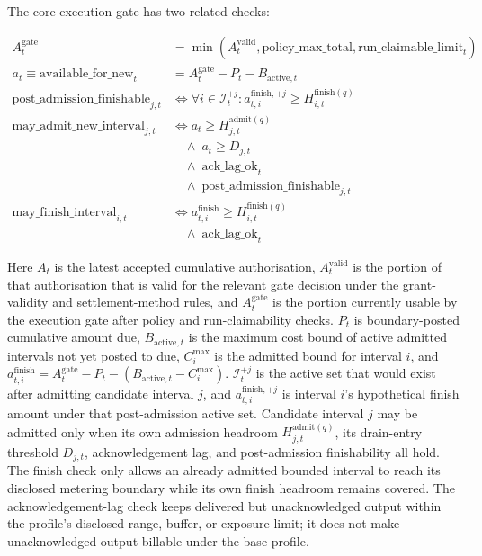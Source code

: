\documentclass[11pt]{article}
\begin{document}
The core execution gate has two related checks:

\[
\begin{aligned}
A_t^{\mathrm{gate}} &=
\min(A_t^{\mathrm{valid}},\mathrm{policy\_max\_total},\mathrm{run\_claimable\_limit}_t)\\
a_t \equiv \mathrm{available\_for\_new}_t &=
A_t^{\mathrm{gate}} - P_t - B_{\mathrm{active},t}\\
\mathrm{post\_admission\_finishable}_{j,t} &\iff
\forall i \in \mathcal{I}_t^{+j}:
a_{t,i}^{\mathrm{finish},+j} \geq H_{i,t}^{\mathrm{finish}(q)}\\
\mathrm{may\_admit\_new\_interval}_{j,t} &\iff
a_t \geq H_{j,t}^{\mathrm{admit}(q)}\\
&\quad\land\;
a_t \geq D_{j,t}\\
&\quad\land\;
\mathrm{ack\_lag\_ok}_t\\
&\quad\land\;
\mathrm{post\_admission\_finishable}_{j,t}\\
\mathrm{may\_finish\_interval}_{i,t} &\iff
a_{t,i}^{\mathrm{finish}} \geq H_{i,t}^{\mathrm{finish}(q)}\\
&\quad\land\;
\mathrm{ack\_lag\_ok}_t
\end{aligned}
\]

Here \(A_t\) is the latest accepted cumulative authorisation, \(A_t^{\mathrm{valid}}\) is the portion of that authorisation that is valid for the relevant gate decision under the grant-validity and settlement-method rules, and \(A_t^{\mathrm{gate}}\) is the portion currently usable by the execution gate after policy and run-claimability checks. \(P_t\) is boundary-posted cumulative amount due, \(B_{\mathrm{active},t}\) is the maximum cost bound of active admitted intervals not yet posted to due, \(C_i^{\max}\) is the admitted bound for interval \(i\), and \(a_{t,i}^{\mathrm{finish}}=A_t^{\mathrm{gate}}-P_t-(B_{\mathrm{active},t}-C_i^{\max})\). \(\mathcal{I}_t^{+j}\) is the active set that would exist after admitting candidate interval \(j\), and \(a_{t,i}^{\mathrm{finish},+j}\) is interval \(i\)'s hypothetical finish amount under that post-admission active set. Candidate interval \(j\) may be admitted only when its own admission headroom \(H_{j,t}^{\mathrm{admit}(q)}\), its drain-entry threshold \(D_{j,t}\), acknowledgement lag, and post-admission finishability all hold. The finish check only allows an already admitted bounded interval to reach its disclosed metering boundary while its own finish headroom remains covered. The acknowledgement-lag check keeps delivered but unacknowledged output within the profile's disclosed range, buffer, or exposure limit; it does not make unacknowledged output billable under the base profile.
\end{document}
